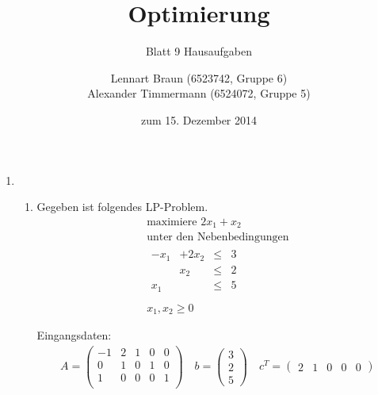 \documentclass[a4paper]{scrartcl}
\title{Optimierung}
\subtitle{Blatt 9 Hausaufgaben}
\author{
	Lennart Braun (6523742, Gruppe 6) \\
    Alexander Timmermann (6524072, Gruppe 5)
}
\date{zum 15. Dezember 2014}
\begin{document}
\maketitle

\begin{enumerate}[label=\bfseries\arabic*.]
    \item %
        \begin{enumerate}
            \item
                Gegeben ist folgendes LP-Problem.
                \begin{equation}
                    \begin{gathered}
                        \text{maximiere }
                        2x_1 +x_2 \\
                        \text{unter den Nebenbedingungen} \\
                        \begin{array}{rrcr}
                            -x_1 & +2x_2 & \leq & 3 \\
                            & x_2 & \leq & 2 \\
                            x_1 & & \leq & 5 \\
                        \end{array} \\
                        x_1, x_2 \geq 0
                    \end{gathered}
                \end{equation}

                Eingangsdaten:
                \begin{gather}
                    A =
                    \begin{pmatrix}
                        -1 & 2 & 1 & 0 & 0 \\
                         0 & 1 & 0 & 1 & 0 \\
                         1 & 0 & 0 & 0 & 1 \\
                    \end{pmatrix}
                    \quad
                    b =
                    \begin{pmatrix}
                        3 \\ 2 \\ 5
                    \end{pmatrix}
                    \quad
                    c^T =
                    \begin{pmatrix}
                        2 & 1 & 0 & 0 & 0
                    \end{pmatrix}
                \end{gather}


\end{enumerate}
\end{enumerate}
\end{document}
